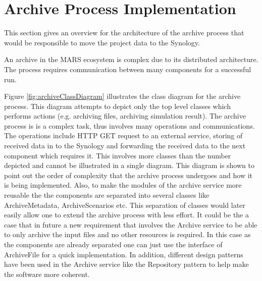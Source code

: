 \section{Archive Process Implementation}
This section gives an overview for the architecture of the archive process that would be responsible
to move the project data to the Synology. 

An archive in the MARS ecosystem is complex due to its distributed architecture. The process requires communication between many components for a 
successful run. %

Figure \ref{fig:archiveClassDiagram} illustrates the class diagram for the archive process. This diagram attempts to depict only the top level classes
which performs actions (e.g. archiving files, archiving simulation result). The archive process is is a complex 
task, thus involves many operations and communications. The operations include HTTP GET request to an external service, storing of received
data in to the Synology and forwarding the received data to the next component which requires it. This involves more classes than the number depicted
and cannot be illustrated in a single diagram. This diagram is shown to point out the order of complexity that the archive process undergoes and how it is being
implemented. Also, to make the modules of the archive service more reusable the the components are separated into several classes
like ArchiveMetadata, ArchiveScenarios etc. This separation
of classes would later easily allow one to extend the archive process with less effort. It could be the a case that in future a new requirement
that involves the Archive service to be able to only archive
the input files and no other resources is required. In this case as the components are already separated one can just use the interface of ArchiveFile for a quick implementation. 
In addition, different design patterns have been used
in the Archive service like the Repository pattern \cite{Thomson-CSF Corporate Research Laboratory} to help make the software more coherent.
 

